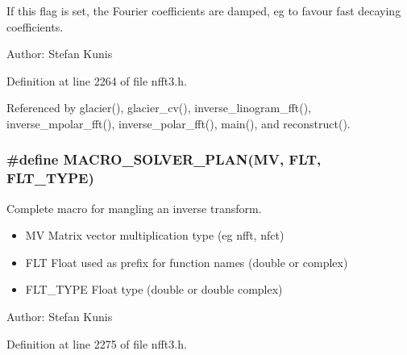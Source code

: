 If this flag is set, the Fourier coefficients are damped, eg to favour fast decaying coefficients. 

\begin{Desc}
\item[Author:]Stefan Kunis \end{Desc}


Definition at line 2264 of file nfft3.h.

Referenced by glacier(), glacier\_\-cv(), inverse\_\-linogram\_\-fft(), inverse\_\-mpolar\_\-fft(), inverse\_\-polar\_\-fft(), main(), and reconstruct().\hypertarget{group__solver_ga42}{
\subsubsection[MACRO\_\-SOLVER\_\-PLAN]{\setlength{\rightskip}{0pt plus 5cm}\#define MACRO\_\-SOLVER\_\-PLAN(MV, FLT, FLT\_\-TYPE)}}
\label{group__solver_ga42}


Complete macro for mangling an inverse transform. 

\begin{itemize}
\item MV Matrix vector multiplication type (eg nfft, nfct) \item FLT Float used as prefix for function names (double or complex) \item FLT\_\-TYPE Float type (double or double complex)\end{itemize}
\begin{Desc}
\item[Author:]Stefan Kunis \end{Desc}


Definition at line 2275 of file nfft3.h.